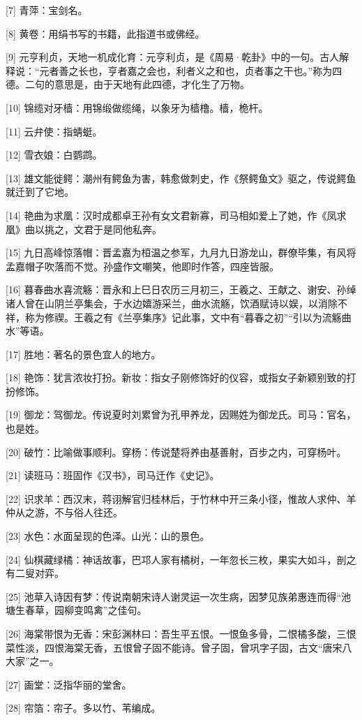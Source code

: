 \documentclass[12pt,UTF8]{ctexbook}
\begin{document}
[7] 青萍：宝剑名。

[8] 黄卷：用绢书写的书籍，此指道书或佛经。

[9] 元亨利贞，天地一机成化育：元亨利贞，是《周易·乾卦》中的一句。古人解释说：“元者善之长也，亨者嘉之会也，利者义之和也，贞者事之干也。”称为四德。二句的意思是，由于天地有此四德，才化生了万物。

[10] 锦缆对牙樯：用锦缎做缆绳，以象牙为樯橹。樯，桅杆。

[11] 云弁使：指蜻蜓。

[12] 雪衣娘：白鹦鹉。

[13] 雄文能徙鳄：潮州有鳄鱼为害，韩愈做刺史，作《祭鳄鱼文》驱之，传说鳄鱼就迁到了它地。

[14] 艳曲为求凰：汉时成都卓王孙有女文君新寡，司马相如爱上了她，作《凤求凰》曲以挑之，文君于是同他私奔。

[15] 九日高峰惊落帽：晋孟嘉为桓温之参军，九月九日游龙山，群僚毕集，有风将孟嘉帽子吹落而不觉。孙盛作文嘲笑，他即时作答，四座皆服。

[16] 暮春曲水喜流觞：晋永和上巳日农历三月初三，王羲之、王献之、谢安、孙绰诸人曾在山阴兰亭集会，于水边嬉游采兰，曲水流觞，饮酒赋诗以娱，以消除不祥，称为修禊。王羲之有《兰亭集序》记此事，文中有“暮春之初”“引以为流觞曲水”等语。

[17] 胜地：著名的景色宜人的地方。

[18] 艳饰：犹言浓妆打扮。新妆：指女子刚修饰好的仪容，或指女子新颖别致的打扮修饰。

[19] 御龙：驾御龙。传说夏时刘累曾为孔甲养龙，因赐姓为御龙氏。司马：官名，也是姓。

[20] 破竹：比喻做事顺利。穿杨：传说楚将养由基善射，百步之内，可穿杨叶。

[21] 读班马：班固作《汉书》，司马迁作《史记》。

[22] 识求羊：西汉末，蒋诩解官归桂林后，于竹林中开三条小径，惟故人求仲、羊仲从之游，不与俗人往还。

[23] 水色：水面呈现的色泽。山光：山的景色。

[24] 仙棋藏绿橘：神话故事，巴邛人家有橘树，一年忽长三枚，果实大如斗，剖之有二叟对弈。

[25] 池草入诗因有梦：传说南朝宋诗人谢灵运一次生病，因梦见族弟惠连而得“池塘生春草，园柳变鸣禽”之佳句。

[26] 海棠带恨为无香：宋彭渊林曰：吾生平五恨。一恨鱼多骨，二恨橘多酸，三恨菜性淡，四恨海棠无香，五恨曾子固不能诗。曾子固，曾巩字子固，古文“唐宋八大家”之一。

[27] 画堂：泛指华丽的堂舍。

[28] 帘箔：帘子。多以竹、苇编成。
\end{document}
